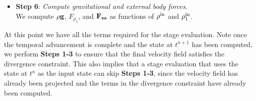 \documentclass[final]{siamltex}
\def\Fb {{\bf F}}
\def\gb {{\bf g}}
\def\mb {{\bf m}}
\begin{document}
\begin{itemize}
\item {\bf Step 6}: {\it Compute gravitational and external body forces}.\\

We compute $\rho\gb$, $F_{\rho_1}$, and $\Fb_{\mb}$ as functions of $\rho^{\rm in}$ and $\rho_1^{\rm in}$.\\

\end{itemize}
At this point we have all the terms required for the stage evaluation.  Note once the temporal 
advancement is complete and the state at $t^{n+1}$ has been computed, we perform 
{\bf Steps 1-3} to ensure that the final velocity field satisfies the divergence constraint.
This also implies that a stage evaluation that uses the state at $t^n$ as the input state 
can skip {\bf Steps 1-3}, since the velocity field has already been projected and the terms 
in the divergence constraint have already been computed.
\end{document}
